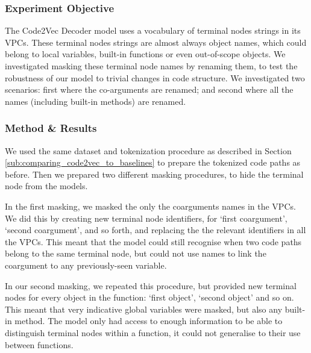 \subsubsection{Experiment Objective} %

The Code2Vec Decoder model uses a vocabulary of terminal nodes strings in its VPCs. 
These terminal nodes strings are almost always object names, which could belong to local variables, built-in functions or even out-of-scope objects. 
We investigated masking these terminal node names by renaming them, to test the robustness of our model to trivial changes in  code structure. 
We investigated two scenarios: first where the co-arguments are renamed; and second where all the names (including built-in methods) are renamed.



\subsubsection{Method \& Results} %

We used the same dataset and tokenization procedure as described in Section \ref{sub:comparing_code2vec_to_baselines} to prepare the tokenized code paths as before.
Then we prepared two different masking procedures, to hide the terminal node from the models.

In the first masking, we masked the only the coarguments names in the VPCs.
We did this by creating new terminal node identifiers, for `first coargument', `second coargument', and so forth, and replacing the the relevant identifiers in all the VPCs.
This meant that the model could still recognise when two code paths belong to the same terminal node, but could not use names to link the coargument to any previously-seen variable.

In our second masking, we repeated this procedure, but provided new terminal nodes for every object in the function: `first object', `second object' and so on.
This meant that very indicative global variables were masked, but also any built-in method.
The model only had access to enough information to be able to distinguish terminal nodes within a function, it could not generalise to their use between functions.

